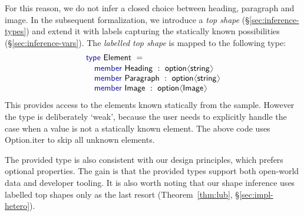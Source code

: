 \documentclass[10pt,preprint,blind,clearpagebib]{sigplanconf}
\newcommand{\langl}{\begin{picture}(4.5,7)
\put(1.1,2.5){\rotatebox{60}{\line(1,0){5.5}}}
\put(1.1,2.5){\rotatebox{300}{\line(1,0){5.5}}}
\end{picture}}
\newcommand{\rangl}{\begin{picture}(4.5,7)
\put(.9,2.5){\rotatebox{120}{\line(1,0){5.5}}}
\put(.9,2.5){\rotatebox{240}{\line(1,0){5.5}}}
\end{picture}}
\newcommand{\kvd}[1]{\textnormal{\textcolor{kvdclr}{\sffamily #1}}}
\newcommand{\ident}[1]{\textnormal{\sffamily #1}}
\begin{document}
For this reason, we do not infer a closed choice between heading, paragraph and image. In the 
subsequent formalization, we introduce a \emph{top shape} (\S\ref{sec:inference-types}) and extend 
it with labels capturing the statically known possibilities (\S\ref{sec:inference-vars}). The 
\emph{labelled top shape} is mapped to the following type:
%
\begin{equation*}
\begin{array}{l}
 \kvd{type}~\ident{Element}~=  \\[0.1em]
 \quad \kvd{member}~\ident{Heading}~:~\ident{option}\langl \ident{string} \rangl\\
 \quad \kvd{member}~\ident{Paragraph}~:~\ident{option}\langl \ident{string} \rangl\\
 \quad \kvd{member}~\ident{Image}~:~\ident{option}\langl \ident{Image} \rangl\\
\end{array}
\end{equation*}
%
This provides access to the elements known statically from the sample. However the type is 
deliberately `weak', because the user needs to explicitly handle the case when a value is not 
a statically known element. The above code uses \ident{Option.iter} to skip all unknown elements. 

The provided type is also consistent with our design principles, which prefers optional properties. 
The gain is that the provided types support both open-world data and developer tooling. It is also 
worth noting that our shape inference uses labelled top shapes only as the last resort 
(Theorem~\ref{thm:lub}, \S\ref{sec:impl-hetero}).

\end{document}

